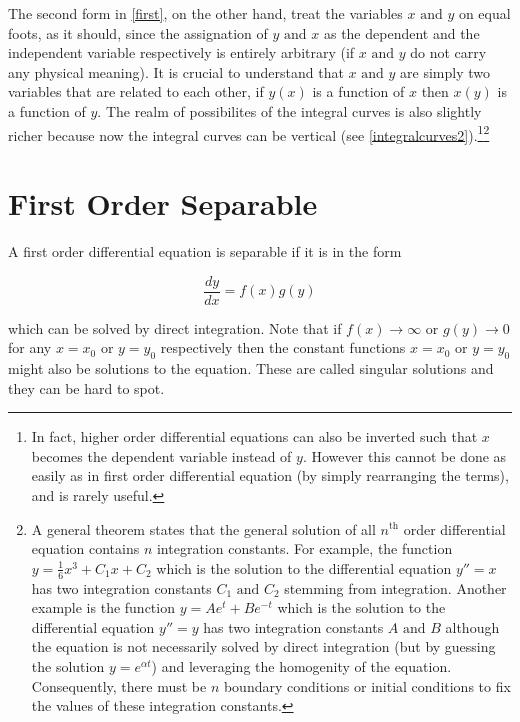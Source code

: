 \documentclass[english,a4paper,12pt]{report}
\begin{document}
The second form in \cref{first}, on the other hand, treat the variables \(x \text { and } y\) on equal foots, as it should, since the assignation of \(y \text { and } x\) as the dependent and the independent variable respectively is entirely arbitrary (if \(x \text { and } y\) do not carry any physical meaning). It is crucial to understand that \(x \text { and } y\) are simply two variables that are related to each other, if \(y(x)\) is a function of \(x\) then \(x(y)\) is a function of \(y\). The realm of possibilites of the integral curves is also slightly richer because now the integral curves can be vertical (see \cref{integralcurves2}).\footnote{In fact, higher order differential equations can also be inverted such that \(x\) becomes the dependent variable instead of \(y\). However this cannot be done as easily as in first order differential equation (by simply rearranging the terms), and is rarely useful.}\footnote{A general theorem states that the general solution of all \(n^{\text{th}} \) order differential equation contains \(n\) integration constants. For example, the function \(y=\frac{1}{6} x^3 + C_1 x + C_2 \) which is the solution to the differential equation \(y'' = x\) has two integration constants \(C_1 \text { and } C_2 \) stemming from integration. Another example is the function \(y = Ae^{ t} + Be^{- t}  \) which is the solution to the differential equation \(y'' = y\) has two integration constants \(A\text { and } B\) although the equation is not necessarily solved by direct integration (but by guessing the solution \(y=e^{\alpha t} \)) and leveraging the homogenity of the equation. Consequently, there must be \(n\) boundary conditions or initial conditions to fix the values of these integration constants.}


\section{First Order Separable}

A first order differential equation is separable if it is in the form

\begin{equation}
    \frac{dy}{dx} = f(x)g(y)
\end{equation}

which can be solved by direct integration. Note that if \(f(x) \to \infty \text { or } g(y) \rightarrow 0\) for any \(x=x_0 \text { or } y=y_0 \) respectively then the constant functions \(x=x_0 \text { or } y = y_0 \) might also be solutions to the equation. These are called singular solutions and they can be hard to spot.
\end{document}
